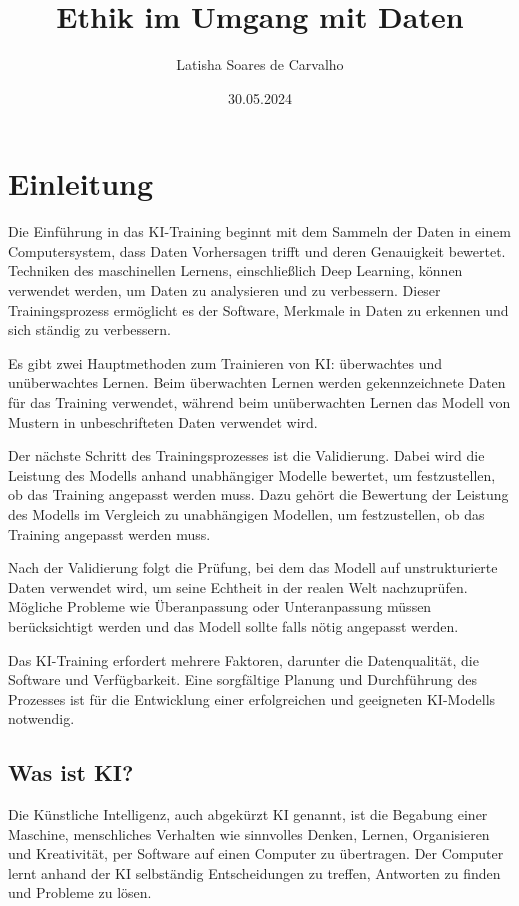 \documentclass{report}
\title{Ethik im Umgang mit Daten}
\author{Latisha Soares de Carvalho}
\date{30.05.2024}
\begin{document}
\maketitle


\tableofcontents

\chapter{Einleitung}
Die Einführung in das KI-Training beginnt mit dem Sammeln der Daten in einem Computersystem, dass Daten Vorhersagen trifft und deren Genauigkeit bewertet.
 Techniken des maschinellen Lernens, einschließlich Deep Learning, können verwendet werden, um Daten zu analysieren und zu verbessern. 
    Dieser Trainingsprozess ermöglicht es der Software, Merkmale in Daten zu erkennen und sich ständig zu verbessern.
    
    Es gibt zwei Hauptmethoden zum Trainieren von KI: überwachtes und unüberwachtes Lernen.
    Beim überwachten Lernen werden gekennzeichnete Daten für das Training verwendet, während beim unüberwachten Lernen das Modell von Mustern in unbeschrifteten Daten verwendet wird.
    
    Der nächste Schritt des Trainingsprozesses ist die Validierung. Dabei wird die Leistung des Modells anhand unabhängiger Modelle bewertet, um festzustellen, ob das Training angepasst werden muss.
    Dazu gehört die Bewertung der Leistung des Modells im Vergleich zu unabhängigen Modellen, um festzustellen, ob das Training angepasst werden muss. 

    Nach der Validierung folgt die Prüfung, bei dem das Modell auf unstrukturierte Daten verwendet wird, um seine Echtheit in der realen Welt nachzuprüfen.
    Mögliche Probleme wie Überanpassung oder Unteranpassung müssen berücksichtigt werden und das Modell sollte falls nötig angepasst werden.

    Das KI-Training erfordert mehrere Faktoren, darunter die Datenqualität, die Software und Verfügbarkeit.
    Eine sorgfältige Planung und Durchführung des Prozesses ist für die Entwicklung einer erfolgreichen und geeigneten KI-Modells notwendig.

    \section {Was ist KI?}
    Die Künstliche Intelligenz, auch abgekürzt KI genannt, ist die Begabung einer Maschine, menschliches Verhalten wie sinnvolles Denken, Lernen, Organisieren und Kreativität, per Software auf einen Computer zu übertragen. Der Computer lernt anhand der KI selbständig Entscheidungen zu treffen, Antworten zu finden und Probleme zu lösen.
\end{document}
